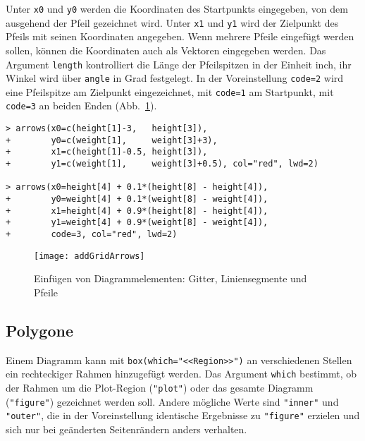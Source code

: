 Unter \lstinline!x0! und \lstinline!y0! werden die Koordinaten des Startpunkts eingegeben, von dem ausgehend der Pfeil gezeichnet wird. Unter \lstinline!x1! und \lstinline!y1! wird der Zielpunkt des Pfeils mit seinen Koordinaten angegeben. Wenn mehrere Pfeile eingefügt werden sollen, können die Koordinaten auch als Vektoren eingegeben werden. Das Argument \lstinline!length! kontrolliert die Länge der Pfeilspitzen in der Einheit inch, ihr Winkel wird über \lstinline!angle! in Grad festgelegt. In der Voreinstellung \lstinline!code=2! wird eine Pfeilspitze am Zielpunkt eingezeichnet, mit \lstinline!code=1! am Startpunkt, mit \lstinline!code=3! an beiden Enden (Abb.\ \ref{fig:addGridArrows}).
\begin{lstlisting}
> arrows(x0=c(height[1]-3,   height[3]),
+        y0=c(weight[1],     weight[3]+3),
+        x1=c(height[1]-0.5, height[3]),
+        y1=c(weight[1],     weight[3]+0.5), col="red", lwd=2)

> arrows(x0=height[4] + 0.1*(height[8] - height[4]),
+        y0=weight[4] + 0.1*(weight[8] - weight[4]),
+        x1=height[4] + 0.9*(height[8] - height[4]),
+        y1=weight[4] + 0.9*(weight[8] - weight[4]),
+        code=3, col="red", lwd=2)
\end{lstlisting}

\begin{figure}[ht]
\centering
\texttt{[image: addGridArrows]}
\vspace*{-1em}
\caption{Einfügen von Diagrammelementen: Gitter, Liniensegmente und Pfeile}
\label{fig:addGridArrows}
\end{figure}

\subsection{Polygone}

Einem Diagramm kann mit \lstinline!box(which="<<Region>>")! an verschiedenen Stellen ein rechteckiger Rahmen hinzugefügt werden. Das Argument \lstinline!which! bestimmt, ob der Rahmen um die Plot-Region (\lstinline!"plot"!) oder das gesamte Diagramm (\lstinline!"figure"!) gezeichnet werden soll. Andere mögliche Werte sind \lstinline!"inner"! und \lstinline!"outer"!, die in der Voreinstellung identische Ergebnisse zu \lstinline!"figure"! erzielen und sich nur bei geänderten Seitenrändern anders verhalten.

